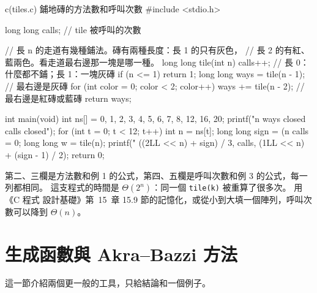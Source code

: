 \begin{example}[label=ex:rec-tiles]{c}{(tiles.c) 鋪地磚的方法數和呼叫次數}
#include <stdio.h>

long long calls;    // tile 被呼叫的次數

// 長 n 的走道有幾種鋪法。磚有兩種長度：長 1 的只有灰色，
// 長 2 的有紅、藍兩色。看走道最右邊那一塊是哪一種。
long long tile(int n)
{
    calls++;
    // 長 0：什麼都不鋪；長 1：一塊灰磚
    if (n <= 1) {
        return 1;
    }
    long long ways = tile(n - 1);   // 最右邊是灰磚
    for (int color = 0; color < 2; color++) {
        ways += tile(n - 2);        // 最右邊是紅磚或藍磚
    }
    return ways;
}

int main(void)
{
    int ns[] = {0, 1, 2, 3, 4, 5, 6, 7, 8, 12, 16, 20};
    printf("n ways closed calls closed\n");
    for (int t = 0; t < 12; t++) {
        int n = ns[t];
        long long sign = (n %
        calls = 0;
        long long w = tile(n);
        printf("%
               ((2LL << n) + sign) / 3,
               calls, (1LL << n) + (sign - 1) / 2);
    }
    return 0;
}
\end{example}

第二、三欄是方法數和例 1 的公式，第四、五欄是呼叫次數和例 3 的公式，每一列都相同。
這支程式的時間是 $\Theta(2^n)$：同一個 \texttt{tile(k)} 被重算了很多次。 用《C 程式
設計基礎》第~15~章 15.9 節的記憶化，或從小到大填一個陣列，呼叫次數可以降到
$\Theta(n)$。

\section{生成函數與 Akra--Bazzi 方法}
\label{sec:rec-gf}

這一節介紹兩個更一般的工具，只給結論和一個例子。

